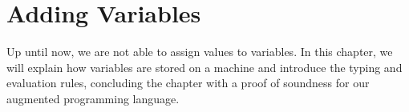 \chapter{Adding Variables}

Up until now, we are not able to assign values to variables. In this chapter, we will explain how variables are stored on a machine and introduce the typing and evaluation rules, concluding the chapter with a proof of soundness for our augmented programming language.

\begin{definition}

	
\end{definition}
